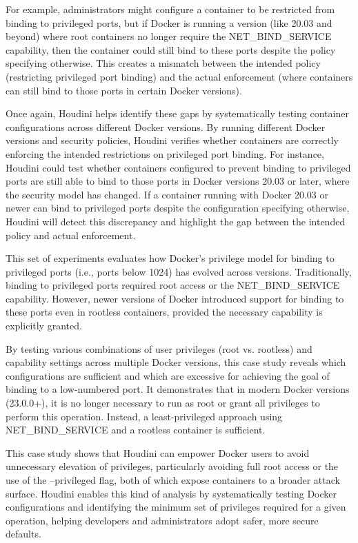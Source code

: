 \begin{doublespace}
For example, administrators might configure a container to be restricted from binding to privileged ports, but if Docker is running a version (like 20.03 and beyond) where root containers no longer require the NET\_BIND\_SERVICE capability, then the container could still bind to these ports despite the policy specifying otherwise. This creates a mismatch between the intended policy (restricting privileged port binding) and the actual enforcement (where containers can still bind to those ports in certain Docker versions).

Once again, Houdini helps identify these gaps by systematically testing container configurations across different Docker versions. By running different Docker versions and security policies, Houdini verifies whether containers are correctly enforcing the intended restrictions on privileged port binding. For instance, Houdini could test whether containers configured to prevent binding to privileged ports are still able to bind to those ports in Docker versions 20.03 or later, where the security model has changed. If a container running with Docker 20.03 or newer can bind to privileged ports despite the configuration specifying otherwise, Houdini will detect this discrepancy and highlight the gap between the intended policy and actual enforcement.

This set of experiments evaluates how Docker's privilege model for binding to privileged ports (i.e., ports below 1024) has evolved across versions. Traditionally, binding to privileged ports required root access or the NET\_BIND\_SERVICE capability. However, newer versions of Docker introduced support for binding to these ports even in rootless containers, provided the necessary capability is explicitly granted.

By testing various combinations of user privileges (root vs. rootless) and capability settings across multiple Docker versions, this case study reveals which configurations are sufficient and which are excessive for achieving the goal of binding to a low-numbered port. It demonstrates that in modern Docker versions (23.0.0+), it is no longer necessary to run as root or grant all privileges to perform this operation. Instead, a least-privileged approach using NET\_BIND\_SERVICE and a rootless container is sufficient.

This case study shows that Houdini can empower Docker users to avoid unnecessary elevation of privileges, particularly avoiding full root access or the use of the --privileged flag, both of which expose containers to a broader attack surface. Houdini enables this kind of analysis by systematically testing Docker configurations and identifying the minimum set of privileges required for a given operation, helping developers and administrators adopt safer, more secure defaults.


\end{doublespace}
